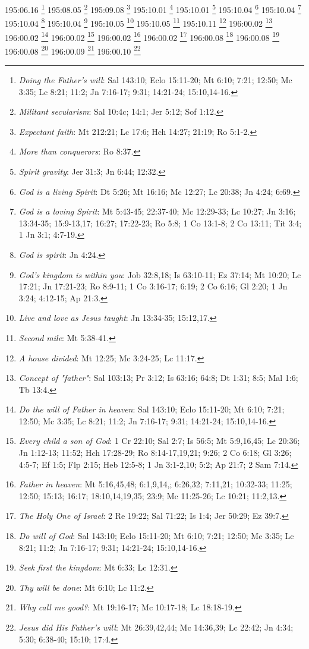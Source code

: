 195:06.16 \footnote{\textit{Doing the Father's will}: Sal 143:10; Eclo 15:11-20; Mt 6:10; 7:21; 12:50; Mc 3:35; Lc 8:21; 11:2; Jn 7:16-17; 9:31; 14:21-24; 15:10,14-16.}
195:08.05 \footnote{\textit{Militant secularism}: Sal 10:4c; 14:1; Jer 5:12; Sof 1:12.}
195:09.08 \footnote{\textit{Expectant faith}: Mt 212:21; Lc 17:6; Hch 14:27; 21:19; Ro 5:1-2.}
195:10.01 \footnote{\textit{More than conquerors}: Ro 8:37.}
195:10.01 \footnote{\textit{Spirit gravity}: Jer 31:3; Jn 6:44; 12:32.}
195:10.04 \footnote{\textit{God is a living Spirit}: Dt 5:26; Mt 16:16; Mc 12:27; Lc 20:38; Jn 4:24; 6:69.}
195:10.04 \footnote{\textit{God is a loving Spirit}: Mt 5:43-45; 22:37-40; Mc 12:29-33; Lc 10:27; Jn 3:16; 13:34-35; 15:9-13,17; 16:27; 17:22-23; Ro 5:8; 1 Co 13:1-8; 2 Co 13:11; Tit 3:4; 1 Jn 3:1; 4:7-19.}
195:10.04 \footnote{\textit{God is spirit}: Jn 4:24.}
195:10.04 \footnote{\textit{God's kingdom is within you}: Job 32:8,18; Is 63:10-11; Ez 37:14; Mt 10:20; Lc 17:21; Jn 17:21-23; Ro 8:9-11; 1 Co 3:16-17; 6:19; 2 Co 6:16; Gl 2:20; 1 Jn 3:24; 4:12-15; Ap 21:3.}
195:10.05 \footnote{\textit{Live and love as Jesus taught}: Jn 13:34-35; 15:12,17.}
195:10.05 \footnote{\textit{Second mile}: Mt 5:38-41.}
195:10.11 \footnote{\textit{A house divided}: Mt 12:25; Mc 3:24-25; Lc 11:17.}
196:00.02 \footnote{\textit{Concept of "father"}: Sal 103:13; Pr 3:12; Is 63:16; 64:8; Dt 1:31; 8:5; Mal 1:6; Tb 13:4.}
196:00.02 \footnote{\textit{Do the will of Father in heaven}: Sal 143:10; Eclo 15:11-20; Mt 6:10; 7:21; 12:50; Mc 3:35; Lc 8:21; 11:2; Jn 7:16-17; 9:31; 14:21-24; 15:10,14-16.}
196:00.02 \footnote{\textit{Every child a son of God}: 1 Cr 22:10; Sal 2:7; Is 56:5; Mt 5:9,16,45; Lc 20:36; Jn 1:12-13; 11:52; Hch 17:28-29; Ro 8:14-17,19,21; 9:26; 2 Co 6:18; Gl 3:26; 4:5-7; Ef 1:5; Flp 2:15; Heb 12:5-8; 1 Jn 3:1-2,10; 5:2; Ap 21:7; 2 Sam 7:14.}
196:00.02 \footnote{\textit{Father in heaven}: Mt 5:16,45,48; 6:1,9,14,; 6:26,32; 7:11,21; 10:32-33; 11:25; 12:50; 15:13; 16:17; 18:10,14,19,35; 23:9; Mc 11:25-26; Lc 10:21; 11:2,13.}
196:00.02 \footnote{\textit{The Holy One of Israel}: 2 Re 19:22; Sal 71:22; Is 1:4; Jer 50:29; Ez 39:7.}
196:00.08 \footnote{\textit{Do will of God}: Sal 143:10; Eclo 15:11-20; Mt 6:10; 7:21; 12:50; Mc 3:35; Lc 8:21; 11:2; Jn 7:16-17; 9:31; 14:21-24; 15:10,14-16.}
196:00.08 \footnote{\textit{Seek first the kingdom}: Mt 6:33; Lc 12:31.}
196:00.08 \footnote{\textit{Thy will be done}: Mt 6:10; Lc 11:2.}
196:00.09 \footnote{\textit{Why call me good?}: Mt 19:16-17; Mc 10:17-18; Lc 18:18-19.}
196:00.10 \footnote{\textit{Jesus did His Father's will}: Mt 26:39,42,44; Mc 14:36,39; Lc 22:42; Jn 4:34; 5:30; 6:38-40; 15:10; 17:4.}
